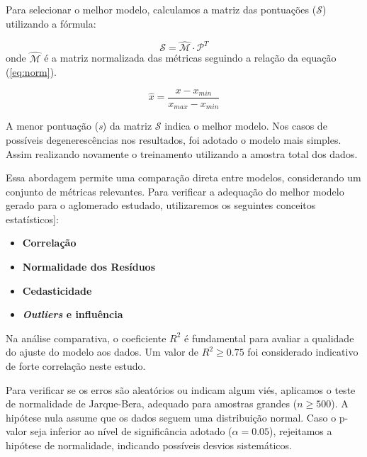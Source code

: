     Para selecionar o melhor modelo, calculamos a matriz das pontuações (\(\mathcal{{S}}\)) utilizando a fórmula:
    
    \begin{equation}
    	\label{eq:score}
    	\mathcal{S} = \mathcal{\hat{M}} \cdot \mathcal{P}^T
    \end{equation}
    onde \(\mathcal{\hat{M}}\) é a matriz normalizada das métricas seguindo a relação da equação (\ref{eq:norm}). 
    
    \begin{equation}
    	\label{eq:norm}
    	\hat{x} = \frac{x - x_{min}} {x_{max} - x_{min}}
    \end{equation}
    
    A menor pontuação (\textit{s}) da matriz \(\mathcal{{S}}\) indica o melhor modelo. Nos casos de possíveis degenerescências nos resultados, foi adotado o modelo mais simples. Assim realizando novamente o treinamento utilizando a amostra total dos dados.
    
    Essa abordagem permite uma comparação direta entre modelos, considerando um conjunto de métricas relevantes. Para verificar a adequação do melhor modelo gerado para o aglomerado estudado, utilizaremos os seguintes conceitos estatísticos]:
    
    \begin{itemize}
    	\item[(i)] \textbf{Correlação}
    	\item[(ii)] \textbf{Normalidade dos Resíduos}
    	\item[(iii)] \textbf{Cedasticidade}
    	\item[(iv)] \textbf{\textit{Outliers} e influência}
    \end{itemize}
    
    Na análise comparativa, o coeficiente \(R^2\) é fundamental para avaliar a qualidade do ajuste do modelo aos dados. Um valor de \(R^2 \geq 0.75\) foi considerado indicativo de forte correlação neste estudo.
    
    Para verificar se os erros são aleatórios ou indicam algum viés, aplicamos o teste de normalidade de Jarque-Bera, adequado para amostras grandes (\(n \geq 500\)). A hipótese nula assume que os dados seguem uma distribuição normal. Caso o p-valor seja inferior ao nível de significância adotado (\(\alpha = 0.05\)), rejeitamos a hipótese de normalidade, indicando possíveis desvios sistemáticos.
